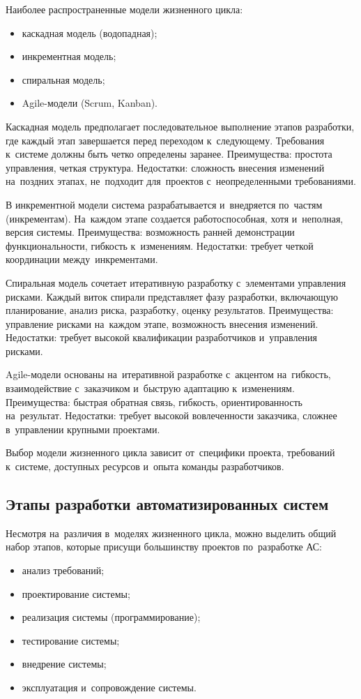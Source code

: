 \documentclass{ou}
\begin{document}
Наиболее распространенные модели жизненного цикла:
\begin{itemize}[label=-, leftmargin=0em, itemindent=3.35em, nosep]
\item каскадная модель (водопадная);
\item инкрементная модель;
\item спиральная модель;
\item Agile-модели (Scrum, Kanban).
\end{itemize}

Каскадная модель предполагает последовательное выполнение этапов разработки, где каждый этап завершается перед переходом к~следующему. Требования к~системе должны быть четко определены заранее. Преимущества: простота управления, четкая структура. Недостатки: сложность внесения изменений на~поздних этапах, не~подходит для~проектов с~неопределенными требованиями.

В инкрементной модели система разрабатывается и~внедряется по~частям (инкрементам). На~каждом этапе создается работоспособная, хотя и~неполная, версия системы. Преимущества: возможность ранней демонстрации функциональности, гибкость к~изменениям. Недостатки: требует четкой координации между~инкрементами.

Спиральная модель сочетает итеративную разработку с~элементами управления рисками. Каждый виток спирали представляет фазу разработки, включающую планирование, анализ риска, разработку, оценку результатов. Преимущества: управление рисками на~каждом этапе, возможность внесения изменений. Недостатки: требует высокой квалификации разработчиков и~управления рисками.

Agile-модели основаны на~итеративной разработке с~акцентом на~гибкость, взаимодействие с~заказчиком и~быструю адаптацию к~изменениям. Преимущества: быстрая обратная связь, гибкость, ориентированность на~результат. Недостатки: требует высокой вовлеченности заказчика, сложнее в~управлении крупными проектами.

Выбор модели жизненного цикла зависит от~специфики проекта, требований к~системе, доступных ресурсов и~опыта команды разработчиков.
\subsection{Этапы разработки автоматизированных систем}
Несмотря на~различия в~моделях жизненного цикла, можно выделить общий набор этапов, которые присущи большинству проектов по~разработке АС:
\begin{itemize}[label=-, leftmargin=0em, itemindent=3.35em, nosep]
\item анализ требований;
\item проектирование системы;
\item реализация системы (программирование);
\item тестирование системы;
\item внедрение системы;
\item эксплуатация и~сопровождение системы.
\end{itemize}
\end{document}
